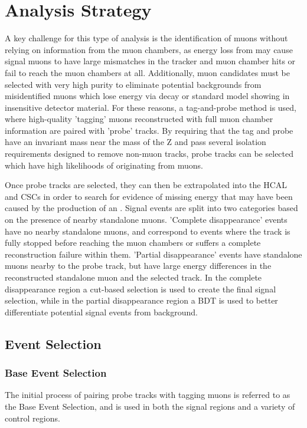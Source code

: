 \chapter{Analysis Strategy}
\label{analysis}
A key challenge for this type of analysis is the identification of muons without relying on information from the muon chambers, as energy loss from \db may cause signal muons to have large mismatches in the tracker and muon chamber hits or fail to reach the muon chambers at all.
Additionally, muon candidates must be selected with very high purity to eliminate potential backgrounds from misidentified muons which lose energy via decay or standard model showing in insensitive detector material.
For these reasons, a tag-and-probe method is used, where high-quality 'tagging' muons reconstructed with full muon chamber information are paired with 'probe' tracks.
By requiring that the tag and probe have an invariant mass near the mass of the Z and pass several isolation requirements designed to remove non-muon tracks, probe tracks can be selected which have high likelihoods of originating from muons.

Once probe tracks are selected, they can then be extrapolated into the HCAL and CSCs in order to search for evidence of missing energy that may have been caused by the production of an \aprime.
Signal events are split into two categories based on the presence of nearby standalone muons.
'Complete disappearance' events have no nearby standalone muons, and correspond to events where the track is fully stopped before reaching the muon chambers or suffers a complete reconstruction failure within them.
'Partial disappearance' events have standalone muons nearby to the probe track, but have large energy differences in the reconstructed standalone muon and the selected track.
In the complete disappearance region a cut-based selection is used to create the final signal selection, while in the partial disappearance region a BDT is used to better differentiate potential signal events from background.

\section{Event Selection}
\subsection{Base Event Selection}
The initial process of pairing probe tracks with tagging muons is referred to as the Base Event Selection, and is used in both the signal regions and a variety of control regions.

